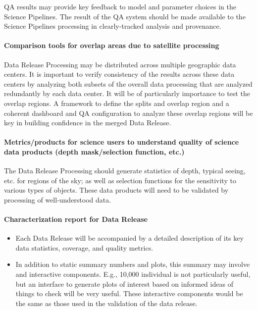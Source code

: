 QA results may provide key feedback to model and parameter choices in the Science Pipelines.  The result of the QA system should be made available to the Science Pipelines processing in clearly-tracked analysis and provenance.


\paragraph{Comparison tools for overlap areas due to satellite processing}
\label{sec:qaComparisonSatelliteDataCenters}

Data Release Processing may be distributed across multiple geographic data centers.  It is important to verify consistency of the results across these data centers by analyzing both subsets of the overall data processing that are analyzed redundantly by each data center.  It will be of particularly importance to test the overlap regions.  A framework to define the splits and overlap region and a coherent dashboard and QA configuration to analyze these overlap regions will be key in building confidence in the merged Data Release.

\paragraph{Metrics/products for science users to understand quality of science data products (depth mask/selection function, etc.)}
\label{sec:qaScienceUsersMetrics}

The Data Release Processing should generate statistics of depth, typical seeing, etc. for regions of the sky; as well as selection functions for the sensitivity to various types of objects.  These data products will need to be validated by processing of well-understood data.


\paragraph{Characterization report for Data Release}
\label{sec:qaCharacterizationReportDrp}
\begin{itemize}
\item Each Data Release will be accompanied by a detailed description of its key data statistics, coverage, and quality metrics.
\item In addition to static summary numbers and plots, this summary may involve and interactive components.  E.g., 10,000 individual is not particularly useful, but an interface to generate plots of interest based on informed ideas of things to check will be very useful. These interactive components would be the same as those used in the validation of the data release.
\end{itemize}



